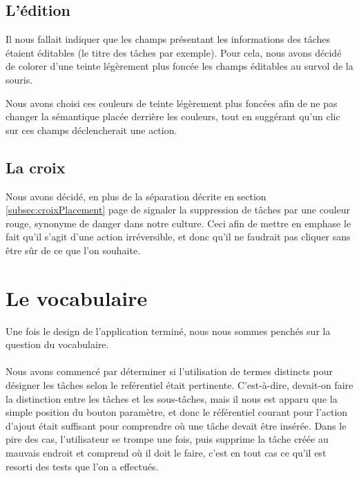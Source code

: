 \documentclass[11pt]{article}
\begin{document}


\subsection{L'édition}

Il nous fallait indiquer que les champs présentant les informations
des tâches étaient éditables (le titre des tâches par exemple). Pour
cela, nous avons décidé de colorer d'une teinte légèrement plus foncée
les champs éditables au survol de la souris.

Nous avons choisi ces couleurs de teinte légèrement plus foncées afin
de ne pas changer la sémantique placée derrière les couleurs, tout en
suggérant qu'un clic sur ces champs déclencherait une action.



\subsection{La croix}

Nous avons décidé, en plus de la séparation décrite en section
\ref{subsec:croixPlacement} page \pageref{subsec:croixPlacement} de
signaler la suppression de tâches par une couleur rouge, synonyme de
danger dans notre culture. Ceci afin de mettre en emphase le fait
qu'il s'agit d'une action irréversible, et donc qu'il ne faudrait pas
cliquer sans être sûr de ce que l'on souhaite.


\section{Le vocabulaire}

Une fois le design de l'application terminé, nous nous sommes penchés
sur la question du vocabulaire.

\paragraph*{}
Nous avons commencé par déterminer si l'utilisation de termes
distincts pour désigner les tâches selon le reférentiel était
pertinente. C'est-à-dire, devait-on faire la distinction entre les
tâches et les sous-tâches, mais il nous est apparu que la simple
position du bouton paramètre, et donc le référentiel courant pour
l'action d'ajout était suffisant pour comprendre où une tâche devait
être insérée. Dans le pire des cas, l'utilisateur se trompe une fois,
puis supprime la tâche créée au mauvais endroit et comprend où il
doit le faire, c'est en tout cas ce qu'il est resorti des tests que
l'on a effectués.
\end{document}
